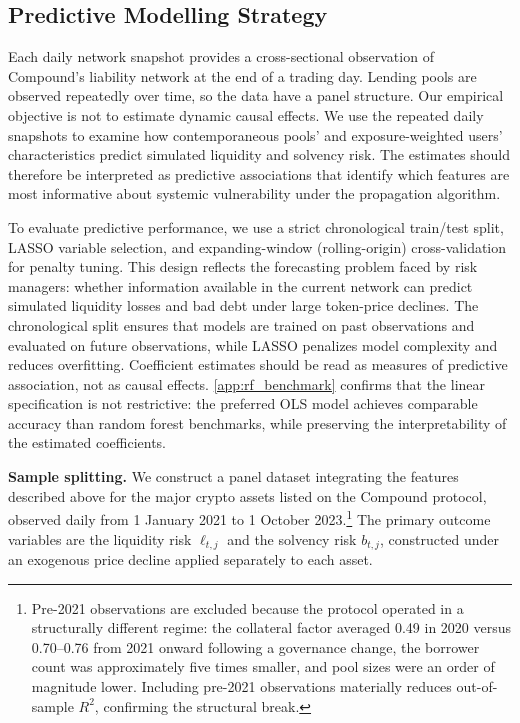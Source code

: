 \documentclass[a4paper,UKenglish,cleveref, autoref, thm-restate]{informs3}
\newcommand{\boldpara}[1]{\noindent\textbf{#1}\quad}
\begin{document}
\subsection{Predictive Modelling Strategy}
\label{sec:modelling_strategy}


Each daily network snapshot provides a cross-sectional observation of Compound’s liability network at the end of a trading day. Lending pools are observed repeatedly over time, so the data have a panel structure. Our empirical objective is not to estimate dynamic causal effects. We use the repeated daily snapshots to examine how contemporaneous pools' and exposure-weighted users' characteristics predict simulated liquidity and solvency risk. The estimates should therefore be interpreted as predictive associations that identify which features are most informative about systemic vulnerability under the propagation algorithm.

To evaluate predictive performance, we use a strict chronological train/test split, LASSO variable selection, and expanding-window (rolling-origin) cross-validation for penalty tuning. This design reflects the forecasting problem faced by risk managers: whether information available in the current network can predict simulated liquidity losses and bad debt under large token-price declines. The chronological split ensures that models are trained on past observations and evaluated on future observations, while LASSO 
penalizes model complexity and reduces overfitting. Coefficient estimates should be read as measures of predictive association, not as causal effects. \ref{app:rf_benchmark} confirms that the linear 
specification is not restrictive: the preferred OLS 
model achieves comparable accuracy than random forest benchmarks, while 
preserving the interpretability of the estimated 
coefficients.
\medskip

\boldpara{Sample splitting.}
We construct a panel dataset integrating the features described above for the major crypto assets listed on the Compound protocol, observed daily from 1 January 2021 to 1 October 2023.\footnote{Pre-2021 observations are excluded because the protocol 
operated in a structurally different regime: the collateral factor 
averaged 0.49 in 2020 versus 0.70--0.76 from 2021 onward following 
a governance change, the borrower count was approximately five times 
smaller, and pool sizes were an order of magnitude lower. Including 
pre-2021 observations materially reduces out-of-sample $R^2$, 
confirming the structural break.} The primary outcome variables are the liquidity risk $\ell_{t,j}$ and the solvency risk $b_{t,j}$, constructed under an exogenous price decline applied separately to each asset.
\end{document}
